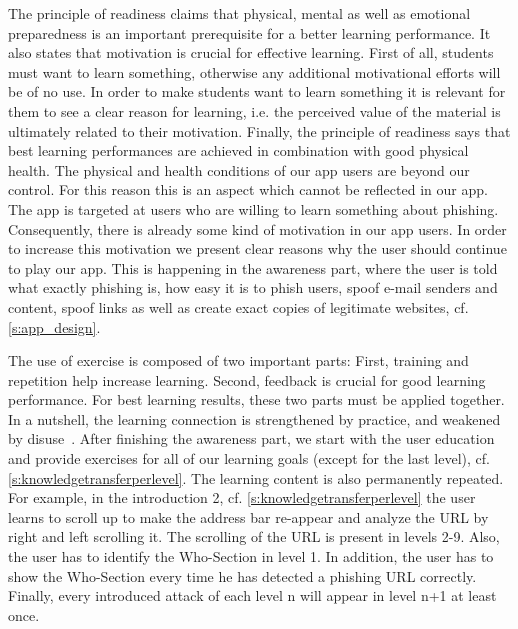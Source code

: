 \begin{description}[leftmargin=0cm]
	\item[Readiness:] The principle of readiness claims that physical, mental as well as emotional preparedness is an important prerequisite for a better learning performance. 
It also states that motivation is crucial for effective learning. 
First of all, students must want to learn something, otherwise any additional motivational efforts will be of no use. 
In order to make students want to learn something it is relevant for them to see a clear reason for learning, i.e. the perceived value of the material is ultimately related to their motivation. 
Finally, the principle of readiness says that best learning performances are achieved in combination with good physical health.
The physical and health conditions of our app users are beyond our control.
For this reason this is an aspect which cannot be reflected in our app.
The app is targeted at users who are willing to learn something about phishing. 
Consequently, there is already some kind of motivation in our app users.
In order to increase this motivation we present clear reasons why the user should continue to play our app.
This is happening in the awareness part, where the user is told what exactly phishing is, how easy it is to phish users, spoof e-mail senders and content, spoof links as well as create exact copies of legitimate websites, cf. \autoref{s:app_design}.
	\item[Exercise:] The use of exercise is composed of two important parts: 
First, training and repetition help increase learning. 
Second, feedback is crucial for good learning performance.
For best learning results, these two parts must be applied together.
In a nutshell, the learning connection is strengthened by practice, and weakened by disuse~\cite{handbook2008us}.
After finishing the awareness part, we start with the user education and provide exercises for all of our learning goals (except for the last level), cf. \autoref{s:knowledgetransferperlevel}.
The learning content is also permanently repeated. 
For example, in the introduction 2, cf. \autoref{s:knowledgetransferperlevel} the user learns to scroll up to make the address bar re-appear and analyze the URL by right and left scrolling it. 
The scrolling of the URL is present in levels 2-9.
Also, the user has to identify the Who-Section in level 1. 
In addition, the user has to show the Who-Section every time he has detected a phishing URL correctly.
Finally, every introduced attack of each level n will appear in level n+1 at least once. 

\end{description}
